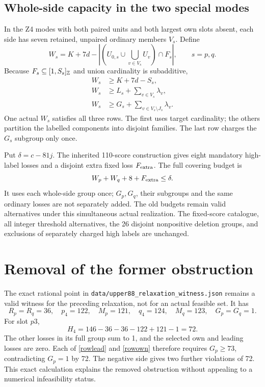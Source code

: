 \documentclass[11pt,a4paper]{article}
\begin{document}
\subsection{Whole-side capacity in the two special modes}
In the Z4 modes with both paired units and both largest own slots absent,
each side has seven retained, unpaired ordinary members $V_s$.
Define
\[
 W_s=K+7d-
 \left|\left(U_{0,s}\cup\bigcup_{v\in V_s}U_v\right)\cap F_s\right|,
 \qquad s=p,q.
\]
Because $F_s\subseteq[1,S_s]_{\mathbb Z}$ and union cardinality is subadditive,
\begin{align}
 W_s&\ge K+7d-S_s,\label{wholecap}\\
 W_s&\ge L_s+\sum_{v\in V_s}\lambda_v,\\
 W_s&\ge G_s+\sum_{v\in V_s\setminus J_s}\lambda_v.\label{wholefull}
\end{align}
One actual $W_s$ satisfies all three rows. The first uses target
cardinality; the others partition the labelled components into disjoint
families. The last row charges the $G_s$ subgroup only once.

Put $\delta=c-81j$. The inherited 110-score construction gives eight
mandatory high-label losses and a disjoint extra fixed loss $F_{\rm extra}$.
The full covering budget is
\[
 W_p+W_q+8+F_{\rm extra}\le\delta.
\]
It uses each whole-side group once; $G_p,G_q$, their subgroups and the
same ordinary losses are not separately added. The old budgets remain
valid alternatives under this simultaneous actual realization.
The fixed-score catalogue, all integer threshold alternatives, the 26
disjoint nonpositive deletion groups, and exclusions of separately
charged high labels are unchanged.

\section{Removal of the former obstruction}
The exact rational point in
\texttt{data/upper88\_relaxation\_witness.json} remains a valid witness for
the preceding relaxation, not for an actual feasible set.
It has
\[
 R_p=R_q=36,\quad p_4=122,\quad M_p=121,\quad
 q_4=124,\quad M_q=123,\quad G_p=G_q=1.
\]
For slot $p3$,
\[
 H_4=146-36-36-122+121-1=72.
\]
The other losses in its full group sum to 1, and the selected own and
leading losses are zero. Each of \eqref{rowlead} and \eqref{rowown}
therefore requires $G_p\ge73$, contradicting $G_p=1$ by 72.
The negative side gives two further violations of 72.
This exact calculation explains the removed obstruction without
appealing to a numerical infeasibility status.
\end{document}
